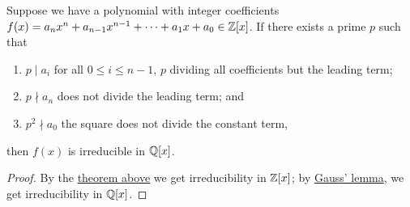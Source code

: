 \begin{corollary}\label{cor:eisenstein-criterion}
    Suppose we have a polynomial with integer coefficients
    \(f(x) = a_n x^n + a_{n-1}x^{n-1} + \cdots + a_1 x + a_0 \in \mathbb{Z}[x]\).
    If there exists a prime \(p\) such that
    \begin{enumerate}[label={(\roman*)}, itemsep=0mm]
        \item \(p \mid a_i\) for all \(0 \leq i \leq n-1\),
            \(p\) dividing all coefficients but the leading term;
        \item \(p \nmid a_n\) does not divide the leading term; and
        \item \(p^2 \nmid a_0\) the square does not divide the constant term,
    \end{enumerate}
    then \(f(x)\) is irreducible in \(\mathbb{Q}[x]\).
\end{corollary}
\begin{proof}
    By the \hyperref[thm:eisenstein-criterion]{theorem above}
    we get irreducibility in \(\mathbb{Z}[x]\);
    by \hyperref[lem:gauss-irreducible]{Gauss' lemma},
    we get irreducibility in \(\mathbb{Q}[x]\).
\end{proof}


